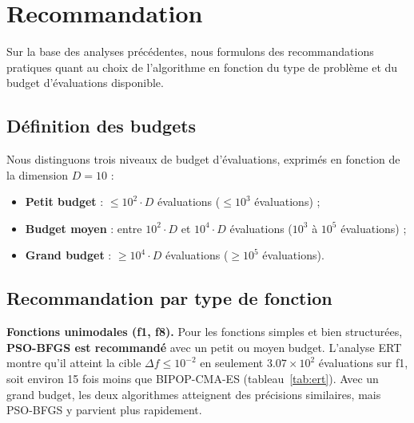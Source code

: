 \documentclass[conference]{IEEEtran}
\begin{document}
\section{Recommandation}

Sur la base des analyses pr\'ec\'edentes, nous formulons des recommandations pratiques quant au choix de l'algorithme en fonction du type de probl\`eme et du budget d'\'evaluations disponible.

\subsection{D\'efinition des budgets}

Nous distinguons trois niveaux de budget d'\'evaluations, exprim\'es en fonction de la dimension $D = 10$ :
\begin{itemize}
    \item \textbf{Petit budget} : $\leq 10^2 \cdot D$ \'evaluations ($\leq 10^3$ \'evaluations) ;
    \item \textbf{Budget moyen} : entre $10^2 \cdot D$ et $10^4 \cdot D$ \'evaluations ($10^3$ \`a $10^5$ \'evaluations) ;
    \item \textbf{Grand budget} : $\geq 10^4 \cdot D$ \'evaluations ($\geq 10^5$ \'evaluations).
\end{itemize}

\subsection{Recommandation par type de fonction}

\textbf{Fonctions unimodales (f1, f8).} Pour les fonctions simples et bien structur\'ees, \textbf{PSO-BFGS est recommand\'e} avec un petit ou moyen budget. L'analyse ERT montre qu'il atteint la cible $\Delta f \leq 10^{-2}$ en seulement $3.07 \times 10^2$ \'evaluations sur f1, soit environ 15 fois moins que BIPOP-CMA-ES (tableau~\ref{tab:ert}). Avec un grand budget, les deux algorithmes atteignent des pr\'ecisions similaires, mais PSO-BFGS y parvient plus rapidement.
\end{document}
